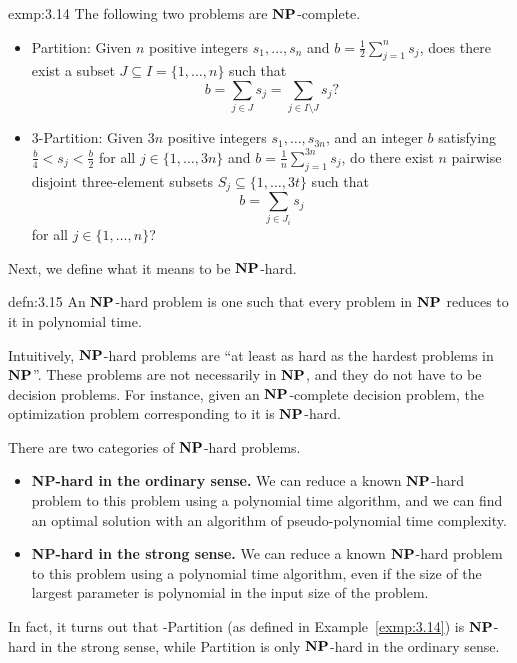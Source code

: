 \begin{exmp}{exmp:3.14}
    The following two problems are $\operatorname{\textbf{NP}}$-complete. 
    \begin{itemize}
        \item {\sc Partition}: Given $n$ positive integers $s_1, \dots, s_n$ 
        and $b = \frac12 \sum_{j=1}^n s_j$, does there exist a subset 
        $J \subseteq I = \{1, \dots, n\}$ such that 
        \[ b = \sum_{j\in J} s_j = \sum_{j\in I\setminus J} s_j? \] 
        \item {\sc $3$-Partition}: Given $3n$ positive integers 
        $s_1, \dots, s_{3n}$, and an integer $b$ satisfying 
        $\frac{b}{4} < s_j < \frac{b}{2}$ for all $j \in \{1, \dots, 3n\}$ 
        and $b = \frac1n \sum_{j=1}^{3n} s_j$, do there exist 
        $n$ pairwise disjoint three-element subsets $S_j \subseteq 
        \{1, \dots, 3t\}$ such that 
        \[ b = \sum_{j\in J_i} s_j \] 
        for all $j \in \{1, \dots, n\}$? 
    \end{itemize}
\end{exmp}

Next, we define what it means to be $\operatorname{\textbf{NP}}$-hard. 

\begin{defn}{defn:3.15}
    An $\operatorname{\textbf{NP}}$-hard problem is one such that every problem in $\operatorname{\textbf{NP}}$ 
    reduces to it in polynomial time. 
\end{defn}

Intuitively, $\operatorname{\textbf{NP}}$-hard problems are ``at least as hard as the hardest 
problems in $\operatorname{\textbf{NP}}$''. These problems are not necessarily in $\operatorname{\textbf{NP}}$, and they 
do not have to be decision problems. 
For instance, given an $\operatorname{\textbf{NP}}$-complete decision problem, the optimization 
problem corresponding to it is $\operatorname{\textbf{NP}}$-hard. 

There are two categories of $\operatorname{\textbf{NP}}$-hard problems.  
\begin{itemize}
    \item {\bf NP-hard in the ordinary sense.} We can reduce a known 
    $\operatorname{\textbf{NP}}$-hard problem to this problem using a polynomial time algorithm, 
    and we can find an optimal solution with an algorithm of pseudo-polynomial 
    time complexity. 
    \item {\bf NP-hard in the strong sense.} We can reduce a known 
    $\operatorname{\textbf{NP}}$-hard problem to this problem using a polynomial time algorithm, 
    even if the size of the largest parameter is polynomial in the 
    input size of the problem. 
\end{itemize}

In fact, it turns out that {-Partition} (as defined in Example~\ref{exmp:3.14})
is $\operatorname{\textbf{NP}}$-hard in the strong sense, while {\sc Partition} is only $\operatorname{\textbf{NP}}$-hard 
in the ordinary sense. 

